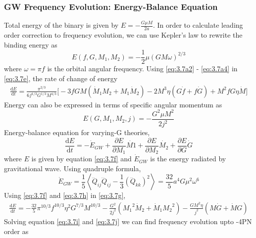 \documentclass[11pt]{article}
\begin{document}
 \subsubsection*{GW Frequency Evolution: Energy-Balance Equation}
 
 \hspace{15.5pt}Total energy of the binary is given by $E=-\frac{G\mu M}{2a}$. In order to calculate leading order correction to frequency evolution, we can use Kepler's law to rewrite the binding energy as
 \begin{equation}\label{eq:3.7e}
 E(f,G,M_1,M_2)=-\frac{1}{2}\mu (GM\omega)^{2/3}
 \end{equation}
 where $\omega=\pi f$ is the orbital angular frequency. Using \eqref{eq:3.7a2} - \eqref{eq:3.7a4} in  \eqref{eq:3.7e}, the rate of change of energy
 \begin{align}\label{eq:3.7j}
 \frac{\mathrm{d} E}{\mathrm{d} t}=\frac{\pi^{2/3}}{6f^{1/3}G^{1/3}M^{4/3}}\bigg[-3fGM(\dot{M}_1M_2+M_1\dot{M}_2)-2M^3\eta(G\dot{f}+f\dot{G})+M^2fG\eta\dot{M}\bigg]
 \end{align}
 \hspace{15.5pt}Energy can also be expressed in terms of specific angular momentum as
 \begin{equation}\label{eq:3.7f}
 E(G,M_1,M_2,j)=-\frac{G^2 \mu  M^2}{2 j^2}
 \end{equation}
 \hspace*{15.5pt} Energy-balance equation for varying-G theories,
 \begin{equation}\label{eq:3.7g}
\frac{\mathrm{d} E}{\mathrm{d} t}=-\dot{E}_{GW}+\frac{\partial E}{\partial M_1}\dot{M1}+\frac{\partial E}{\partial M_2}\dot{M_2}+\frac{\partial E}{\partial G}\dot{G}
 \end{equation}
 where $E$ is given by equation \eqref{eq:3.7f} and $\dot{E}_{GW}$ is the energy radiated by gravitational wave. Using quadruple formula,
 \begin{equation}\label{eq:3.7h}
 \dot{E}_{GW}=\frac{1}{5}\left \langle\dddot{Q}_{ij}\dddot{Q}_{ij}-\frac{1}{3}(\dddot{Q}_{kk})^2\right \rangle=\frac{32}{5} a^4 G \mu ^2 \omega ^6
 \end{equation}
 \hspace{15.5pt}Using \eqref{eq:3.7f} and \eqref{eq:3.7h} in \eqref{eq:3.7g},
 \begin{align}\label{eq:3.7i}
\frac{\mathrm{d} E}{\mathrm{d} t}=- \frac{32}{5} \pi ^{10/3} f^{10/3} \eta ^2 G^{7/3} M^{10/3}-\frac{G^2}{2j^2}({M_1}^2\dot{M}_2+\dot{M}_1{M_2}^2)-\frac{GM^2\eta}{j^2}(M\dot{G}+\dot{M}G)
 \end{align}
 \hspace{15.5pt}Solving equation \eqref{eq:3.7i} and \eqref{eq:3.7j} we can find frequency evolution upto -4PN order as
 
\end{document}
